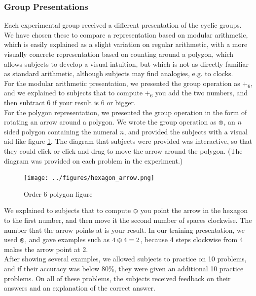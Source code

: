 \documentclass[11pt]{article}
\def\hex{\mathrel{%
    \mathchoice{\HEX}{\HEX}{\scriptsize\HEX}{\tiny\HEX}%
}}
\def\HEX{{%
    \setbox0\hbox{\varhexagon}%
    \rlap{\hbox to \wd0{\hss\raisebox{1 pt}{\scaleobj{0.6}{6}}\hss}}\box0
}}
\begin{document}
\subsubsection{Group Presentations}
Each experimental group received a different presentation of the cyclic groups. We have chosen these to compare a representation based on modular arithmetic, which is easily explained as a slight variation on regular arithmetic, with a more visually concrete representation based on counting around a polygon, which allows subjects to develop a visual intuition, but which is not as directly familiar as standard arithmetic, although subjects may find analogies, e.g. to clocks. \\[11pt] 
For the modular arithmetic presentation, we presented the group operation as $+_6$, and we explained to subjects that to compute $+_6$ you add the two numbers, and then subtract $6$ if your result is $6$ or bigger.\\[11pt]
For the polygon representation, we presented the group operation in the form of rotating an arrow around a polygon. We wrote the group operation as $\hex$, an $n$ sided polygon containing the numeral $n$, and provided the subjects with a visual aid like figure \ref{hexagonex}. The diagram that subjects were provided was interactive, so that they could click or click and drag to move the arrow around the polygon. (The diagram was provided on each problem in the experiment.)
\begin{figure}[H] \centering \texttt{[image: ../figures/hexagon\_arrow.png]} \caption{Order 6 polygon figure} \label{hexagonex} \end{figure} \noindent
We explained to subjects that to compute $\hex$ you point the arrow in the hexagon to the first number, and then move it the second number of spaces clockwise. The number that the arrow points at is your result. In our training presentation, we used $\hex$, and gave examples such as $4 \hex 4 = 2$, because 4 steps clockwise from 4 makes the arrow point at 2. \\[11pt]
After showing several examples, we allowed subjects to practice on 10 problems, and if their accuracy was below 80\%, they were given an additional 10 practice problems. On all of these problems, the subjects received feedback on their answers and an explanation of the correct answer. 
\end{document}
